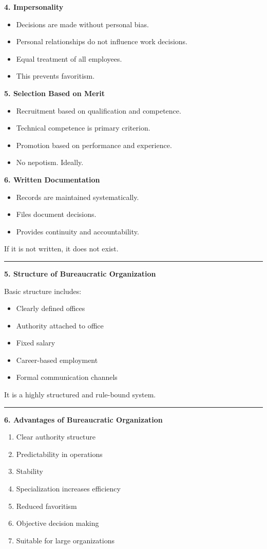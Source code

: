\documentclass[10pt,a4paper]{article}
\newcommand{\separator}{\vspace{0.4em}\noindent\rule{\linewidth}{0.6pt}\vspace{0.4em}}
\begin{document}
\textbf{4. Impersonality}
\begin{itemize}
  \item Decisions are made without personal bias.
  \item Personal relationships do not influence work decisions.
  \item Equal treatment of all employees.
  \item This prevents favoritism.
\end{itemize}

\textbf{5. Selection Based on Merit}
\begin{itemize}
  \item Recruitment based on qualification and competence.
  \item Technical competence is primary criterion.
  \item Promotion based on performance and experience.
  \item No nepotism. Ideally.
\end{itemize}

\textbf{6. Written Documentation}
\begin{itemize}
  \item Records are maintained systematically.
  \item Files document decisions.
  \item Provides continuity and accountability.
\end{itemize}

If it is not written, it does not exist.

\separator

\textbf{5. Structure of Bureaucratic Organization}

Basic structure includes:

\begin{itemize}
  \item Clearly defined offices
  \item Authority attached to office
  \item Fixed salary
  \item Career-based employment
  \item Formal communication channels
\end{itemize}

It is a highly structured and rule-bound system.

\separator

\textbf{6. Advantages of Bureaucratic Organization}

\begin{enumerate}
  \item Clear authority structure
  \item Predictability in operations
  \item Stability
  \item Specialization increases efficiency
  \item Reduced favoritism
  \item Objective decision making
  \item Suitable for large organizations
\end{enumerate}
\end{document}

